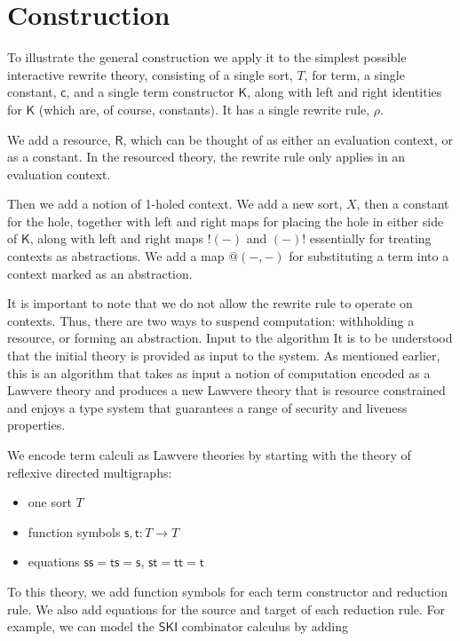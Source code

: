 \documentclass{llncs}
\renewcommand{\:}{\colon}
\begin{document}
\section{Construction}
To illustrate the general construction we apply it to the simplest
possible interactive rewrite theory, consisting of a single sort, $T$,
for term, a single constant, $\mathsf{c}$, and a single term constructor $\mathsf{K}$, along
with left and right identities for $\mathsf{K}$ (which are, of course,
constants). It has a single rewrite rule, $\rho$.

We add a resource, $\mathsf{R}$, which can be thought of as either an evaluation
context, or as a constant. In the resourced theory, the rewrite rule
only applies in an evaluation context.

Then we add a notion of 1-holed context. We add a new sort, $X$, then a
constant for the hole, together with left and right maps for placing
the hole in either side of $\mathsf{K}$, along with left and right maps $!(-)$ and
$(-)!$ essentially for treating contexts as abstractions. We add a map
$@(-,-)$ for substituting a term into a context marked as an
abstraction.

It is important to note that we do not allow the rewrite rule to
operate on contexts. Thus, there are two ways to suspend computation:
withholding a resource, or forming an abstraction.  Input to the
algorithm It is to be understood that the initial theory is provided
as input to the system. As mentioned earlier, this is an algorithm
that takes as input a notion of computation encoded as a Lawvere
theory and produces a new Lawvere theory that is resource constrained
and enjoys a type system that guarantees a range of security and
liveness properties.

We encode term calculi as Lawvere theories by starting with the theory
of reflexive directed multigraphs:

\begin{itemize}
  \item one sort $T$
  \item function symbols $\mathsf{s}, \mathsf{t}: T \rightarrow T$
  \item equations $\mathsf{ss} = \mathsf{ts} = \mathsf{s}$, $\mathsf{st} = \mathsf{tt} = \mathsf{t}$
\end{itemize}

To this theory, we add function symbols for each term constructor and
reduction rule.  We also add equations for the source and target of
each reduction rule.  For example, we can model the $\mathsf{SKI}$ combinator
calculus by adding
\end{document}
